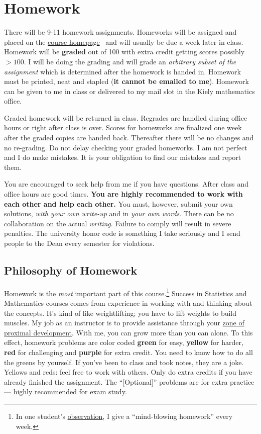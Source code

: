 \documentclass[12pt]{article}
\newcommand{\ingreen}[1]{\color{green}\textbf{#1} \color{black}}
\newcommand{\inyellow}[1]{\color{yellow}\textbf{#1} \color{black}}
\newcommand{\inred}[1]{\color{red}\textbf{#1} \color{black}}
\newcommand{\inpurple}[1]{\color{purple}\textbf{#1} \color{black}}
\newcommand{\coursewebpage}{\href{https://github.com/kapelner/QC_Math_341_Spring_2017}{course homepage}}
\newcommand{\qu}[1]{``#1''}
\begin{document}
\section*{Homework}

There will be 9-11 homework assignments. Homeworks will be assigned and placed on the \coursewebpage~ and will usually be due a week later in class. Homework will be \textbf{graded} out of 100 with extra credit getting scores possibly $> 100$. I will be doing the grading and will grade an \textit{arbitrary subset of the assignment} which is determined after the homework is handed in. Homework must be printed, neat and stapled (\textbf{it cannot be emailed to me}). Homework can be given to me in class or delivered to my mail slot in the Kiely mathematics office.

Graded homework will be returned in class. Regrades are handled during office hours or right after class is over. Scores for homeworks are finalized one week after the graded copies are handed back. Thereafter there will be no changes and no re-grading. Do not delay checking your graded homeworks. I am not perfect and I do make mistakes. It is your obligation to find our mistakes and report them.

You are encouraged to seek help from me if you have questions. After class and office hours are good times. \ingreen{You are highly recommended to work with each other and help each other.} You must, however, submit your own solutions, \textit{with your own write-up} and in \textit{your own words}. There can be no collaboration on the actual \textit{writing}. Failure to comply will result in severe penalties. The university honor code is something I take seriously and I send people to the Dean every semester for violations.

\subsection*{Philosophy of Homework}


Homework is the \textit{most} important part of this course.\footnote{In one student's \href{http://www.ratemyprofessors.com/ShowRatings.jsp?tid=1951051}{observation}, I give a \qu{mind-blowing homework} every week.} Success in Statistics and Mathematics courses comes from experience in working with and thinking about the concepts. It's kind of like weightlifting; you have to lift weights to build muscles. My job as an instructor is to provide assistance through your \href{http://en.wikipedia.org/wiki/Zone_of_proximal_development}{zone of proximal development}. With me, you can grow more than you can alone. To this effect, homework problems are color coded \ingreen{green} for easy, \inyellow{yellow} for harder, \inred{red} for challenging and \inpurple{purple} for extra credit. You need to know how to do all the greens by yourself. If you've been to class and took notes, they are a joke. Yellows and reds: feel free to work with others. Only do extra credits if you have already finished the assignment. The \qu{[Optional]} problems are for extra practice --- highly recommended for exam study.
\end{document}
